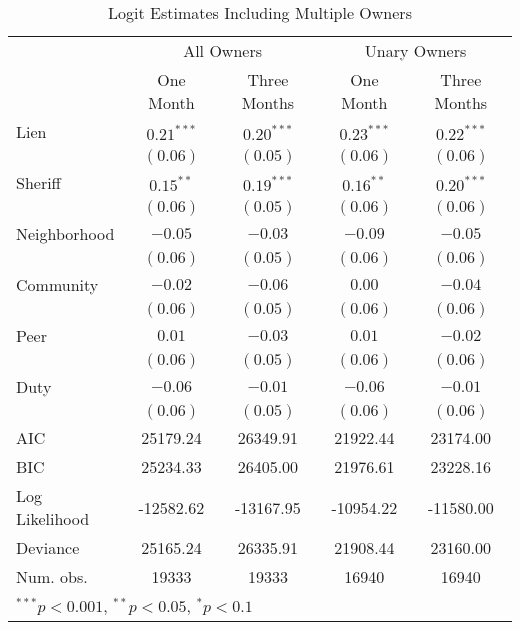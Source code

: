 \begin{appendices}
\begin{table}[htbp]
\caption{Logit Estimates Including Multiple Owners}
\label{sh_logit_rob}
\begin{center}
\begin{adjustbox}{width=\textwidth,totalheight=0.9\textheight,keepaspectratio}
\begin{tabular}{l c c c c }
\hline
 & \multicolumn{2}{c}{All Owners} & \multicolumn{2}{c}{Unary Owners} \\
 & One Month & Three Months & One Month & Three Months \\
\hline
Lien           & $0.21^{***}$ & $0.20^{***}$ & $0.23^{***}$ & $0.22^{***}$ \\
               & $(0.06)$     & $(0.05)$     & $(0.06)$     & $(0.06)$     \\
Sheriff        & $0.15^{**}$  & $0.19^{***}$ & $0.16^{**}$  & $0.20^{***}$ \\
               & $(0.06)$     & $(0.05)$     & $(0.06)$     & $(0.06)$     \\
Neighborhood   & $-0.05$      & $-0.03$      & $-0.09$      & $-0.05$      \\
               & $(0.06)$     & $(0.05)$     & $(0.06)$     & $(0.06)$     \\
Community      & $-0.02$      & $-0.06$      & $0.00$       & $-0.04$      \\
               & $(0.06)$     & $(0.05)$     & $(0.06)$     & $(0.06)$     \\
Peer           & $0.01$       & $-0.03$      & $0.01$       & $-0.02$      \\
               & $(0.06)$     & $(0.05)$     & $(0.06)$     & $(0.06)$     \\
Duty           & $-0.06$      & $-0.01$      & $-0.06$      & $-0.01$      \\
               & $(0.06)$     & $(0.05)$     & $(0.06)$     & $(0.06)$     \\
\hline
AIC            & 25179.24     & 26349.91     & 21922.44     & 23174.00     \\
BIC            & 25234.33     & 26405.00     & 21976.61     & 23228.16     \\
Log Likelihood & -12582.62    & -13167.95    & -10954.22    & -11580.00    \\
Deviance       & 25165.24     & 26335.91     & 21908.44     & 23160.00     \\
Num. obs.      & 19333        & 19333        & 16940        & 16940        \\
\hline
\multicolumn{5}{l}{\scriptsize{$^{***}p<0.001$, $^{**}p<0.05$, $^*p<0.1$}}
\end{tabular}
\end{adjustbox}
\end{center}
\end{table}


\end{appendices}
